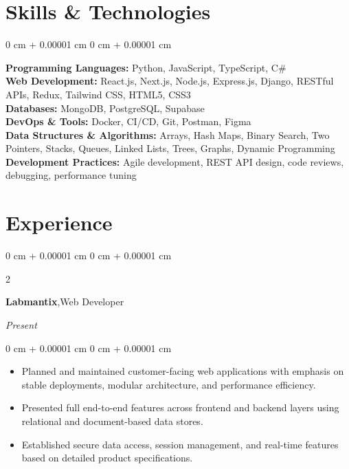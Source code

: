 \documentclass[10pt, letterpaper]{article}
\newenvironment{highlights}{
    \begin{itemize}[
        topsep=0.10 cm,
        parsep=0.10 cm,
        partopsep=0pt,
        itemsep=0pt,
        leftmargin=0.4 cm + 10pt
    ]
}{
    \end{itemize}
} %
\newenvironment{onecolentry}{
    \begin{adjustwidth}{
        0 cm + 0.00001 cm
    }{
        0 cm + 0.00001 cm
    }
}{
    \end{adjustwidth}
} %
\newenvironment{twocolentry}[2][]{
    \onecolentry
    \def\secondColumn{#2}
    \setcolumnwidth{\fill, 4.5 cm}
    \begin{paracol}{2}
}{
    \switchcolumn \raggedleft \secondColumn
    \end{paracol}
    \endonecolentry
} %
\begin{document}
        
\section{Skills \& Technologies}

\begin{onecolentry}
    \textbf{Programming Languages:} Python, JavaScript, TypeScript, C\# \\[3pt]

    \textbf{Web Development:} React.js, Next.js, Node.js, Express.js, Django, RESTful APIs, Redux, Tailwind CSS, HTML5, CSS3 \\[3pt]

    \textbf{Databases:} MongoDB, PostgreSQL, Supabase \\[3pt]

    \textbf{DevOps \& Tools:} Docker, CI/CD, Git, Postman, Figma \\[3pt]


    \textbf{Data Structures \& Algorithms:} Arrays, Hash Maps, Binary Search, Two Pointers, Stacks, Queues, Linked Lists, Trees, Graphs, Dynamic Programming \\[3pt]

   \textbf{Development Practices:} Agile development, REST API design, code reviews, debugging, performance tuning

\end{onecolentry}







\section{Experience}


\begin{twocolentry}{
    \textit{Present} }
    \textbf{Labmantix},{Web Developer}
    \vspace{0.1 cm}
\end{twocolentry}
\begin{onecolentry}
    \begin{highlights}
        \item Planned and maintained customer-facing web applications with emphasis on stable deployments, modular architecture, and performance efficiency.
        \item Presented full end-to-end features across frontend and backend layers using relational and document-based data stores.
        \item Established secure data access, session management, and real-time features based on detailed product specifications.

    \end{highlights}
\end{onecolentry}
\end{document}

